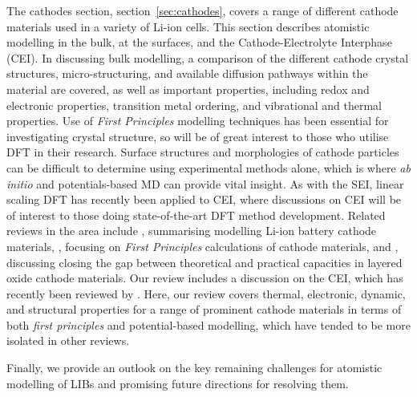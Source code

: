 \documentclass[../main.tex]{subfiles}
\begin{document}
The cathodes section, section~\ref{sec:cathodes}, covers a range of different cathode materials used in a variety of Li-ion cells. This section describes atomistic modelling in the bulk, at the surfaces, and the Cathode-Electrolyte Interphase (CEI). In discussing bulk modelling, a comparison of the different cathode crystal structures, micro-structuring, and available diffusion pathways within the material are covered, as well as important properties, including redox and electronic properties, transition metal ordering, and vibrational and thermal properties. Use of \textit{First Principles} modelling techniques has been essential for investigating crystal structure, so will be of great interest to those who utilise DFT in their research. Surface structures and morphologies of cathode particles can be difficult to determine using experimental methods alone, which is where \textit{ab initio} and potentials-based MD can provide vital insight. As with the SEI, linear scaling DFT has recently been applied to CEI, where discussions on CEI will be of interest to those doing state-of-the-art DFT method development. Related reviews in the area include \citeauthor{ma2018computer}, \cite{ma2018computer} summarising modelling Li-ion battery cathode materials, \citeauthor{yan2014review}, \cite{yan2014review} focusing on \textit{First Principles} calculations of cathode materials, and \citeauthor{wang2018reviving}, \cite{wang2018reviving} discussing closing the gap between theoretical and practical capacities in layered oxide cathode materials. Our review includes a discussion on the CEI, which has recently been reviewed by \citeauthor{maleki2019controllable}. \cite{maleki2019controllable} Here, our review covers thermal, electronic, dynamic, and structural properties for a range of prominent cathode materials in terms of both \textit{first principles} and potential-based modelling, which have tended to be more isolated in other reviews.

Finally, we provide an outlook on the key remaining challenges for atomistic modelling of LIBs and promising future directions for resolving them.
\end{document}
